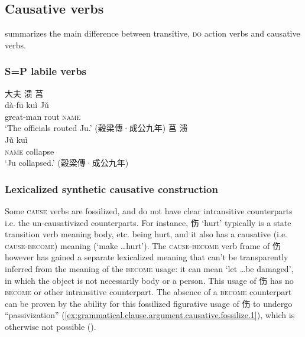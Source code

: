 \documentclass[UTF8, a4paper, oneside, scheme=plain, 12pt]{ctexrep}
\newcommand*{\citepage}[1]{p.~{#1}}
\newcommand{\translate}[1]{`#1'}
\newcommand*{\category}[1]{\textsc{#1}}
\begin{document}
\subsection{Causative verbs}

\citet[\citepage{272}]{meiguang2018} summarizes the main difference between transitive, \category{do} action verbs and causative verbs.

\subsubsection{S=P labile verbs}\label{sec:valency.monotransitive.s-p}

\begin{exe}
    \ex
    \glll 大夫 溃 莒 \\
    dà-fū kuì Jǔ \\
    great-man rout \category{name} \\
    \glt\translate{The officials routed Ju.} \hfill (穀梁傳·成公九年)
    \ex
    \glll 莒 溃 \\
    Jǔ kuì \\
    \category{name} collapse \\
    \glt\translate{Ju collapsed.} \hfill (穀梁傳·成公九年)
\end{exe}

\subsubsection{Lexicalized synthetic causative construction}
\label{sec:grammatical.clause.verbal.argument-structure.causative.fossilization}

Some \category{cause} verbs are fossilized,
and do not have clear intransitive counterparts
i.e. the un-causativized counterparts.
For instance, 伤 \translate{hurt} typically is a state transition verb meaning body, etc. being hurt,
and it also has a causative (i.e. \category{cause}-\category{become}) meaning
(\translate{make \dots hurt}).
The \category{cause}-\category{become} verb frame of 伤 however has gained a separate lexicalized meaning that can't be transparently inferred from the meaning of the \category{become} usage:
it can mean \translate{let \dots be damaged},
in which the object is not necessarily body or a person.
This usage of 伤 has no \category{become} or other intransitive counterpart.
The absence of a \category{become} counterpart can be proven by 
the ability for this fossilized figurative usage of 伤 to undergo ``passivization'' 
(\ref{ex:grammatical.clause.argument.causative.fossilize.1}),
which is otherwise not possible ().
\end{document}
